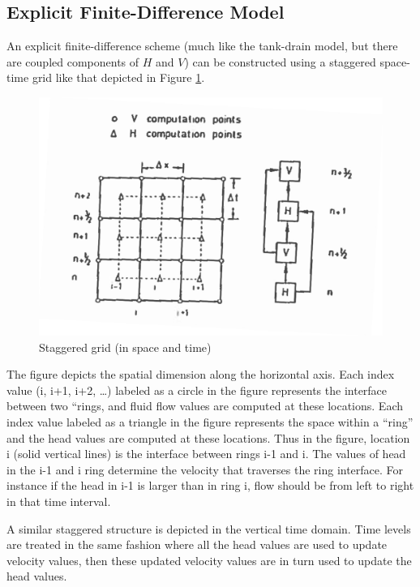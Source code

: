 \subsection{Explicit Finite-Difference Model}
An explicit finite-difference scheme (much like the tank-drain model, but there are coupled components of $H$ and $V$) can be constructed using a staggered space-time grid like that depicted in Figure \ref{fig:StaggeredSpaceTimeGrid}.

\begin{figure}[htbp] %
   \centering
   \includegraphics[width=6in]{./11-PipelineTransients/StaggeredSpaceTimeGrid.jpg} 
   \caption{Staggered grid (in space and time)}
   \label{fig:StaggeredSpaceTimeGrid}
\end{figure}

The figure depicts the spatial dimension along the horizontal axis.  
Each index value (i, i+1, i+2, \dots) labeled as a circle in the figure represents the interface between two ``rings, and fluid flow values are computed at these locations.  
Each index value labeled as a triangle in the figure represents the space within a ``ring'' and the head values are computed at these locations.   
Thus in the figure, location i (solid vertical lines) is the interface between rings i-1 and i. 
The values of head in the i-1 and i ring determine the velocity that traverses the ring interface.
For instance if the head in i-1 is larger than in ring i, flow should be from left to right in that time interval.

A similar staggered structure is depicted in the vertical time domain. 
Time levels are treated in the same fashion where all the head values are used to update velocity values, then these updated velocity values are in turn used to update the head values.


